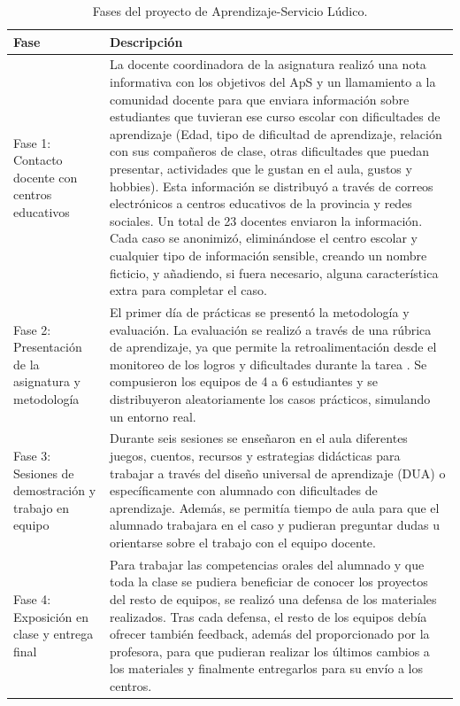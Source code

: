 \documentclass[spanish]{textolivre}
\begin{document}
\begin{table}[h!]
\small
\begin{threeparttable}
    \centering
    \caption{Fases del proyecto de Aprendizaje-Servicio Lúdico.}
    \label{tab01}
    \begin{tabular}{p{}p{}}
    \toprule
    Fase & Descripción \\ 
    \midrule
    Fase 1: Contacto docente con centros educativos & 
    La docente coordinadora de la asignatura realizó una nota informativa con los objetivos del ApS y un llamamiento a la comunidad docente para que enviara información sobre estudiantes que tuvieran ese curso escolar con dificultades de aprendizaje (Edad, tipo de dificultad de aprendizaje, relación con sus compañeros de clase, otras dificultades que puedan presentar, actividades que le gustan en el aula, gustos y hobbies). Esta información se distribuyó a través de correos electrónicos a centros educativos de la provincia y redes sociales.
    Un total de 23 docentes enviaron la información. Cada caso se anonimizó, eliminándose el centro escolar y cualquier tipo de información sensible, creando un nombre ficticio, y añadiendo, si fuera necesario, alguna característica extra para completar el caso. \\
    
    Fase 2: Presentación de la asignatura y metodología &
    El primer día de prácticas se presentó la metodología y evaluación.
    La evaluación se realizó a través de una rúbrica de aprendizaje, ya que permite la retroalimentación desde el monitoreo de los logros y dificultades durante la tarea \cite{calle-alvarez_rubrica_2020}.
    Se compusieron los equipos de 4 a 6 estudiantes y se distribuyeron aleatoriamente los casos prácticos, simulando un entorno real. \\
    
    Fase 3: Sesiones de demostración y trabajo en equipo &
    Durante seis sesiones se enseñaron en el aula diferentes juegos, cuentos, recursos y estrategias didácticas para trabajar a través del diseño universal de aprendizaje (DUA) \cite{cortes_diaz_fundamentos_2021} o específicamente con alumnado con dificultades de aprendizaje. Además, se permitía tiempo de aula para que el alumnado trabajara en el caso y pudieran preguntar dudas u orientarse sobre el trabajo con el equipo docente. \\
    
    Fase 4: Exposición en clase y entrega final &
    Para trabajar las competencias orales del alumnado y que toda la clase se pudiera beneficiar de conocer los proyectos del resto de equipos, se realizó una defensa de los materiales realizados. Tras cada defensa, el resto de los equipos debía ofrecer también feedback, además del proporcionado por la profesora, para que pudieran realizar los últimos cambios a los materiales y finalmente entregarlos para su envío a los centros. \\
    

\end{tabular}
\end{threeparttable}
\end{table}
\end{document}
